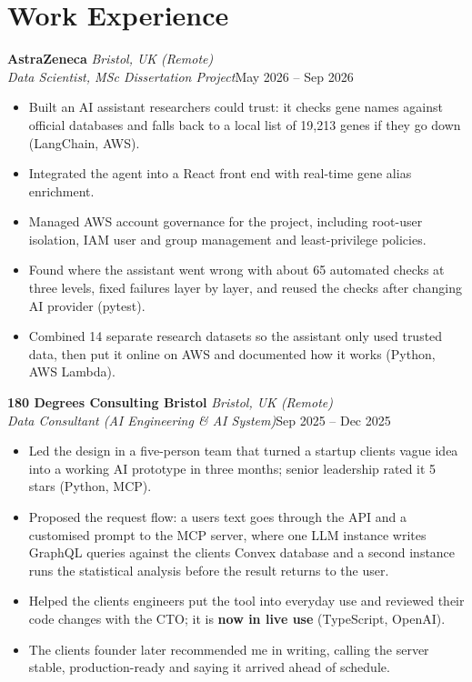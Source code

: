 \documentclass[a4paper,11pt]{article}
\newcommand{\role}[4]{%
  \textbf{#1}{\color{muted}\,\textperiodcentered\,\textit{#2}}\\
  \textit{#4}\hfill{\color{muted}#3}\par}
\newcommand{\gap}{\vspace{5pt}}
\newcommand{\num}[1]{\textbf{#1}}   %
\begin{document}
\section{Work Experience}
\role{AstraZeneca}{Bristol, UK (Remote)}{May 2026 – Sep 2026}{Data Scientist, MSc Dissertation Project}
\begin{itemize}
  \item Built an AI assistant researchers could trust: it checks gene names against official databases and falls back to a local list of 19,213 genes if they go down (LangChain, AWS).
  \item Integrated the agent into a React front end with real-time gene alias enrichment.
  \item Managed AWS account governance for the project, including root-user isolation, IAM user and group management and least-privilege policies.
  \item Found where the assistant went wrong with about 65 automated checks at three levels, fixed failures layer by layer, and reused the checks after changing AI provider (pytest).
  \item Combined 14 separate research datasets so the assistant only used trusted data, then put it online on AWS and documented how it works (Python, AWS Lambda).
\end{itemize}
\gap
{}
\role{180 Degrees Consulting Bristol}{Bristol, UK (Remote)}{Sep 2025 – Dec 2025}{Data Consultant (AI Engineering \& AI System)}
\begin{itemize}
  \item Led the design in a five-person team that turned a startup client\textquotesingle{}s vague idea into a working AI prototype in three months; senior leadership rated it 5 stars (Python, MCP).
  \item Proposed the request flow: a user\textquotesingle{}s text goes through the API and a customised prompt to the MCP server, where one LLM instance writes GraphQL queries against the client\textquotesingle{}s Convex database and a second instance runs the statistical analysis before the result returns to the user.
  \item Helped the client\textquotesingle{}s engineers put the tool into everyday use and reviewed their code changes with the CTO; it is \num{now in live use} (TypeScript, OpenAI).
  \item The client\textquotesingle{}s founder later recommended me in writing, calling the server \textquotesingle{}stable, production-ready\textquotesingle{} and saying it arrived ahead of schedule.
\end{itemize}
\end{document}
